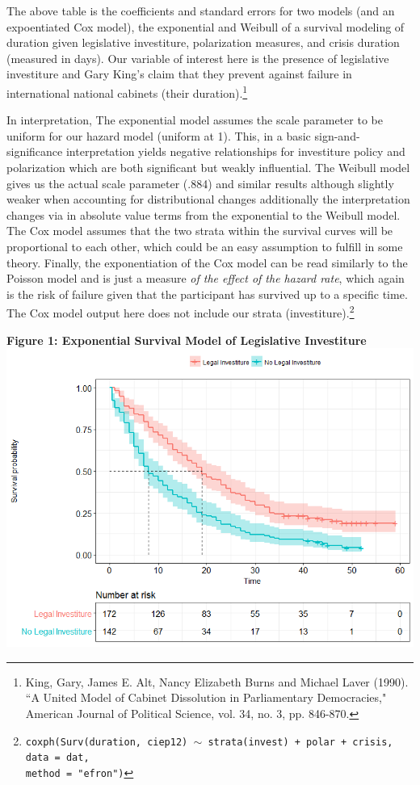\documentclass[12pt]{article}\usepackage[]{graphicx}\usepackage[]{color}
\begin{document}
\begin{flushleft}
The above table is the coefficients and standard errors for two models (and an expoentiated Cox model), the exponential and Weibull of a survival modeling of duration given legislative investiture, polarization measures, and crisis duration (measured in days). Our variable of interest here is the presence of legislative investiture and Gary King's claim that they prevent against failure in international national cabinets (their duration).\footnote{King, Gary, James E. Alt, Nancy Elizabeth Burns and Michael Laver (1990). ``A United Model of Cabinet Dissolution in Parliamentary Democracies," American Journal of Political Science, vol. 34, no. 3, pp. 846-870.}

In interpretation, The exponential model assumes the scale parameter to be uniform for our hazard model (uniform at 1). This, in a basic sign-and-significance interpretation yields negative relationships for investiture policy and polarization which are both significant but weakly influential. The Weibull model gives us the actual scale parameter (.884) and similar results although slightly weaker when accounting for distributional changes additionally the interpretation changes via in absolute value terms from the exponential to the Weibull model. The Cox model assumes that the two strata within the survival curves will be proportional to each other, which could be an easy assumption to fulfill in some theory. Finally, the exponentiation of the Cox model can be read similarly to the Poisson model and is just a measure \textit{of the effect of the hazard rate}, which again is the risk of failure given that the participant has survived up to a specific time. The Cox model output here does not include our strata (investiture).\footnote{\texttt{coxph(Surv(duration, ciep12) $\sim$ strata(invest) + polar + crisis, data = dat,\\
 method = "efron")}}


\begin{center}
\textbf{Figure 1: Exponential Survival Model of Legislative Investiture}
\includegraphics[scale=.65]{Surv}
\end{center}



\end{flushleft}
\end{document}
